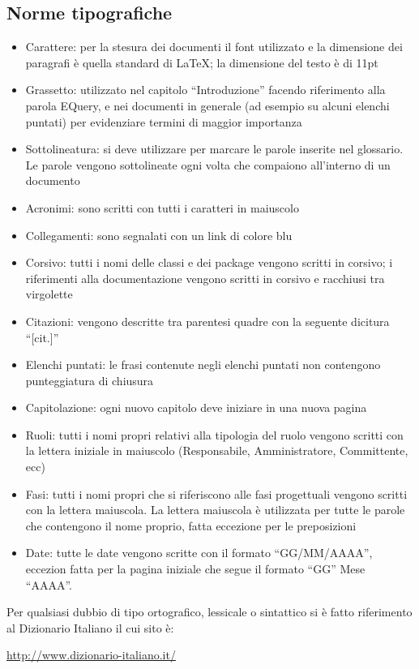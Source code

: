 \documentclass[a4paper,11pt]{article}
\begin{document}
\subsection{Norme tipografiche}
\begin{itemize}
\item Carattere: per la stesura dei documenti il font utilizzato e la dimensione dei paragrafi \`e quella standard di \LaTeX; la dimensione del testo \`e di 11pt
\item Grassetto: utilizzato nel capitolo ``Introduzione'' facendo riferimento alla parola EQuery, e nei documenti in generale (ad esempio su alcuni elenchi puntati) per evidenziare termini di maggior importanza 
\item Sottolineatura: si deve utilizzare per marcare le parole inserite nel glossario. Le parole vengono sottolineate ogni volta che compaiono all'interno di un documento
\item Acronimi: sono scritti con tutti i caratteri in maiuscolo
\item Collegamenti: sono segnalati con un link di colore blu
\item Corsivo: tutti i nomi delle classi e dei package vengono scritti in corsivo; i riferimenti alla documentazione vengono scritti in corsivo e racchiusi tra virgolette
\item Citazioni: vengono descritte tra parentesi quadre con la seguente dicitura ``[cit.]''
\item Elenchi puntati: le frasi contenute negli elenchi puntati non contengono punteggiatura di chiusura
\item Capitolazione: ogni nuovo capitolo deve iniziare in una nuova pagina
\item Ruoli: tutti i nomi propri relativi alla tipologia del ruolo vengono scritti con la lettera iniziale in maiuscolo (Responsabile, Amministratore, Committente, ecc)
\item Fasi: tutti i nomi propri che si riferiscono alle fasi progettuali vengono scritti con la lettera maiuscola. La lettera maiuscola \`e utilizzata per tutte le parole che contengono il nome proprio, fatta eccezione per le preposizioni
\item Date: tutte le date vengono scritte con il formato ``GG/MM/AAAA'', eccezion fatta per la pagina iniziale che segue il formato ``GG'' Mese ``AAAA''.
\end{itemize}
Per qualsiasi dubbio di tipo ortografico, lessicale o sintattico si \`e fatto riferimento al Dizionario Italiano il cui sito \`e:
\begin{center}
\url{http://www.dizionario-italiano.it/}
\end{center}
\end{document}

